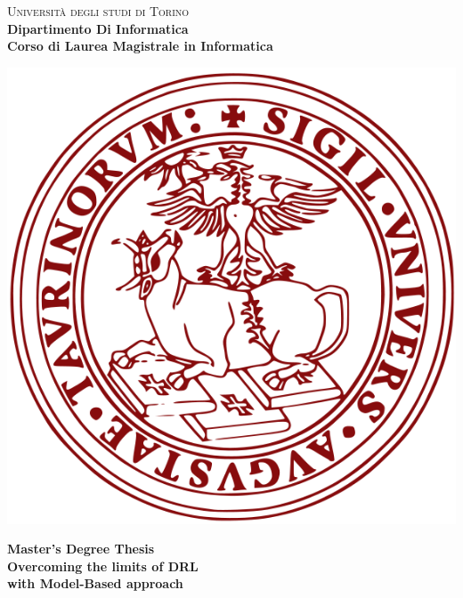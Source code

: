 \begin{titlepage}
\begin{center}
{{\Large{\textsc{Universit\`a degli studi di Torino \\}}}} \vspace{5mm} {\small{\bf Dipartimento Di Informatica\\ \vspace{3mm}
Corso di Laurea Magistrale in Informatica}}
\vspace{5mm}
\end{center}
\begin{center}
\includegraphics[scale=.3]{head/logo.png}
\end{center}
\begin{center}
\vspace{5mm}
{\large{\bf Master's Degree Thesis \\}}
\vspace{5mm}
{\LARGE{\bf Overcoming the limits of DRL \\ with Model-Based approach }}
\end{center}
\vspace{20mm}
\par
\noindent
\begin{minipage}[t]{0.47\textwidth}

\end{minipage}
\end{titlepage}
